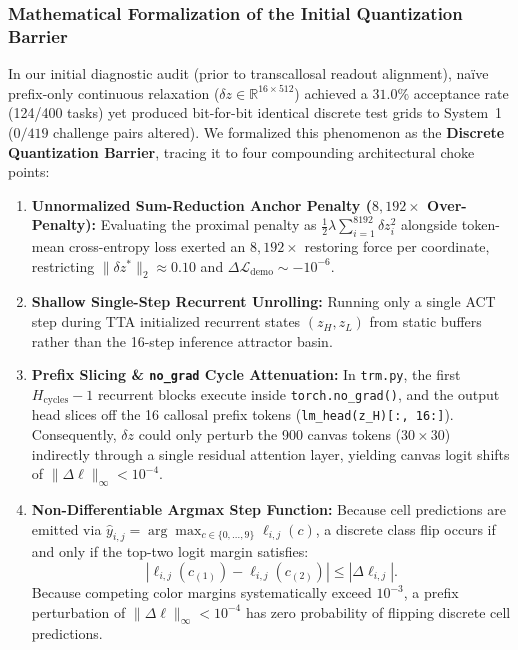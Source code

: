 \documentclass[11pt,a4paper]{article}
\theoremstyle{plain}
\theoremstyle{definition}
\theoremstyle{remark}
\begin{document}
\subsubsection{Mathematical Formalization of the Initial Quantization Barrier}
In our initial diagnostic audit (prior to transcallosal readout alignment), na\"ive prefix-only continuous relaxation ($\delta z \in \mathbb{R}^{16 \times 512}$) achieved a $31.0\%$ acceptance rate (124/400 tasks) yet produced bit-for-bit identical discrete test grids to System~1 ($0 / 419$ challenge pairs altered). We formalized this phenomenon as the \textbf{Discrete Quantization Barrier}, tracing it to four compounding architectural choke points:
\begin{enumerate}
    \item \textbf{Unnormalized Sum-Reduction Anchor Penalty ($8{,}192\times$ Over-Penalty):} Evaluating the proximal penalty as $\frac{1}{2}\lambda\sum_{i=1}^{8192}\delta z_i^2$ alongside token-mean cross-entropy loss exerted an $8{,}192\times$ restoring force per coordinate, restricting $\|\delta z^*\|_2 \approx 0.10$ and $\Delta \mathcal{L}_{\mathrm{demo}} \sim -10^{-6}$.
    \item \textbf{Shallow Single-Step Recurrent Unrolling:} Running only a single ACT step during TTA initialized recurrent states $(z_H, z_L)$ from static buffers rather than the 16-step inference attractor basin.
    \item \textbf{Prefix Slicing \& \texttt{no\_grad} Cycle Attenuation:} In \texttt{trm.py}, the first $H_{\mathrm{cycles}} - 1$ recurrent blocks execute inside \texttt{torch.no\_grad()}, and the output head slices off the 16 callosal prefix tokens (\texttt{lm\_head(z\_H)[:, 16:]}). Consequently, $\delta z$ could only perturb the 900 canvas tokens ($30 \times 30$) indirectly through a single residual attention layer, yielding canvas logit shifts of $\|\Delta \ell\|_\infty < 10^{-4}$.
    \item \textbf{Non-Differentiable Argmax Step Function:} Because cell predictions are emitted via $\hat{y}_{i,j} = \arg\max_{c \in \{0, \dots, 9\}} \ell_{i,j}(c)$, a discrete class flip occurs if and only if the top-two logit margin satisfies:
    \begin{equation}
        |\ell_{i,j}(c_{(1)}) - \ell_{i,j}(c_{(2)})| \le |\Delta \ell_{i,j}|.
    \end{equation}
    Because competing color margins systematically exceed $10^{-3}$, a prefix perturbation of $\|\Delta \ell\|_\infty < 10^{-4}$ has zero probability of flipping discrete cell predictions.
\end{enumerate}
\end{document}
